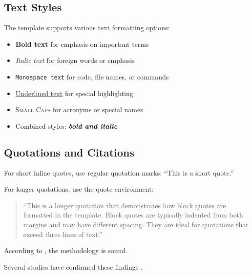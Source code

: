 \subsection*{Text Styles}
\label{subsec:text_styles}

The template supports various text formatting options:

\begin{itemize}
	\item \textbf{Bold text} for emphasis on important terms
	\item \textit{Italic text} for foreign words or emphasis
	\item \texttt{Monospace text} for code, file names, or commands
	\item \underline{Underlined text} for special highlighting
	\item \textsc{Small Caps} for acronyms or special names
	\item Combined styles: \textbf{\textit{bold and italic}}
\end{itemize}

\subsection*{Quotations and Citations}
\label{subsec:quotations}

For short inline quotes, use regular quotation marks: ``This is a short quote.''

For longer quotations, use the quote environment:

\begin{quote}
	``This is a longer quotation that demonstrates how block quotes are formatted
	in the template. Block quotes are typically indented from both margins and
	may have different spacing. They are ideal for quotations that exceed
	three lines of text.'' \cite{example2023}
\end{quote}

According to \textcite[p.~42]{examplebook2022}, the methodology is sound.

Several studies have confirmed these findings \parencite{example2023, conference2023}.


